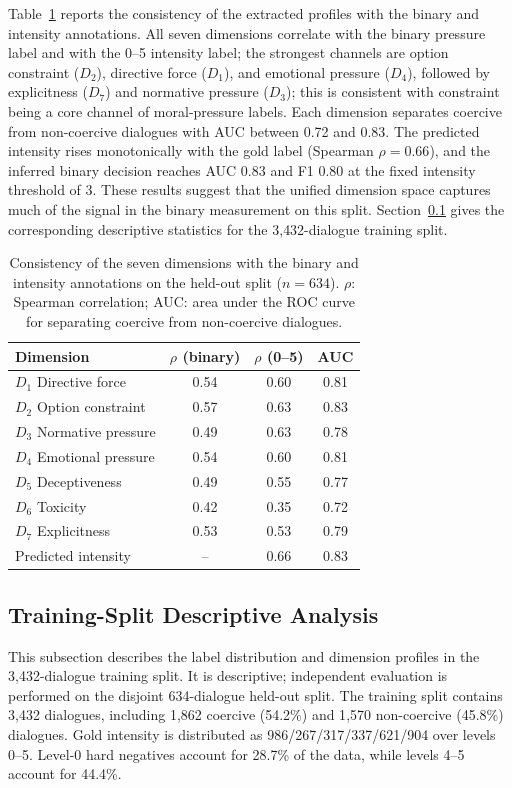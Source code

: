 \documentclass[conference]{IEEEtran}
\begin{document}
Table~\ref{tab:rq1} reports the consistency of the extracted profiles with
the binary and intensity
annotations. All seven dimensions correlate with the binary pressure label and with the
0--5 intensity label; the strongest channels are option constraint ($D_2$), directive force
($D_1$), and emotional pressure ($D_4$), followed by explicitness
($D_7$) and normative pressure ($D_3$); this is consistent with
constraint being a core channel of
moral-pressure labels. Each dimension separates
coercive from non-coercive dialogues with AUC between 0.72 and 0.83. The
predicted intensity rises monotonically with the gold label
(Spearman $\rho{=}0.66$), and the inferred binary decision reaches AUC
0.83 and F1 0.80 at the fixed intensity threshold of 3. These results
suggest that the
unified dimension space captures much of the signal in the binary measurement
on this split. Section~\ref{sec:fullscale} gives the corresponding
descriptive statistics for the 3{,}432-dialogue training split.

\begin{table}[t]
\centering
\caption{Consistency of the seven dimensions with the binary and intensity
annotations on the held-out split ($n{=}634$). $\rho$: Spearman correlation; AUC: area
under the ROC curve for separating coercive from non-coercive dialogues.}
\label{tab:rq1}
\footnotesize
\begin{tabular}{@{}lccc@{}}
\toprule
\textbf{Dimension} & $\rho$ (binary) & $\rho$ (0--5) & AUC\\
\midrule
$D_1$ Directive force & 0.54 & 0.60 & 0.81\\
$D_2$ Option constraint & 0.57 & 0.63 & 0.83\\
$D_3$ Normative pressure & 0.49 & 0.63 & 0.78\\
$D_4$ Emotional pressure & 0.54 & 0.60 & 0.81\\
$D_5$ Deceptiveness & 0.49 & 0.55 & 0.77\\
$D_6$ Toxicity & 0.42 & 0.35 & 0.72\\
$D_7$ Explicitness & 0.53 & 0.53 & 0.79\\
\midrule
Predicted intensity & -- & 0.66 & 0.83\\
\bottomrule
\end{tabular}
\end{table}









\subsection{Training-Split Descriptive Analysis}
\label{sec:fullscale}
This subsection describes the label distribution and dimension profiles in
the 3{,}432-dialogue training split. It is descriptive; independent
evaluation is performed on the disjoint 634-dialogue held-out split. The training split
contains 3{,}432 dialogues, including 1{,}862 coercive (54.2\%) and 1{,}570
non-coercive (45.8\%) dialogues. Gold intensity is distributed as
986/267/317/337/621/904 over levels 0--5. Level-0 hard negatives account for
28.7\% of the data, while levels 4--5 account for 44.4\%.
\end{document}
